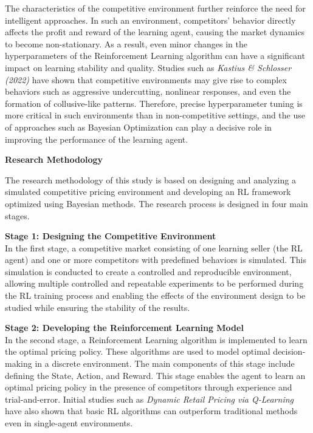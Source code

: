 \documentclass[11pt,a4paper]{article}
\begin{document}
\begin{tcolorbox}
The characteristics of the competitive environment further reinforce the need for intelligent approaches. In such an environment, competitors' behavior directly affects the profit and reward of the learning agent, causing the market dynamics to become non-stationary. As a result, even minor changes in the hyperparameters of the Reinforcement Learning algorithm can have a significant impact on learning stability and quality. Studies such as \textit{Kastius \& Schlosser (2022)} have shown that competitive environments may give rise to complex behaviors such as aggressive undercutting, nonlinear responses, and even the formation of collusive-like patterns. Therefore, precise hyperparameter tuning is more critical in such environments than in non-competitive settings, and the use of approaches such as Bayesian Optimization can play a decisive role in improving the performance of the learning agent.

\vspace{0.3cm}
\textbf{\large Research Methodology}

The research methodology of this study is based on designing and analyzing a simulated competitive pricing environment and developing an RL framework optimized using Bayesian methods. The research process is designed in four main stages.

\textbf{Stage 1: Designing the Competitive Environment}\\
In the first stage, a competitive market consisting of one learning seller (the RL agent) and one or more competitors with predefined behaviors is simulated. This simulation is conducted to create a controlled and reproducible environment, allowing multiple controlled and repeatable experiments to be performed during the RL training process and enabling the effects of the environment design to be studied while ensuring the stability of the results.

\textbf{Stage 2: Developing the Reinforcement Learning Model}\\
In the second stage, a Reinforcement Learning algorithm is implemented to learn the optimal pricing policy. These algorithms are used to model optimal decision-making in a discrete environment. The main components of this stage include defining the State, Action, and Reward. This stage enables the agent to learn an optimal pricing policy in the presence of competitors through experience and trial-and-error. Initial studies such as \textit{Dynamic Retail Pricing via Q-Learning} have also shown that basic RL algorithms can outperform traditional methods even in single-agent environments.


\end{tcolorbox}
\end{document}

